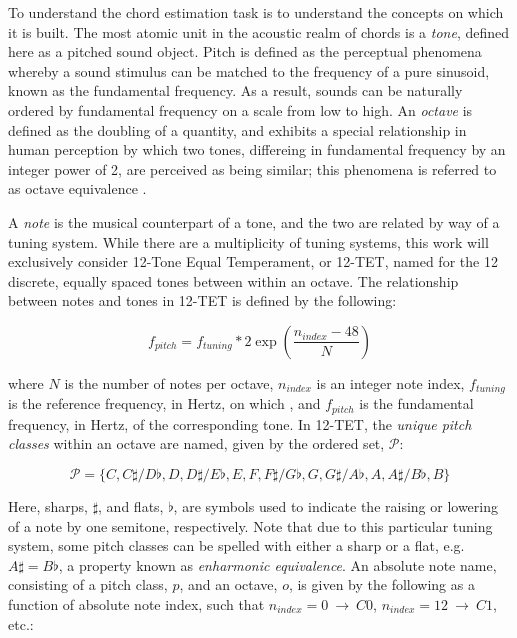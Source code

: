To understand the chord estimation task is to understand the concepts on which it is built.
The most atomic unit in the acoustic realm of chords is a \emph{tone}, defined here as a pitched sound object.
Pitch is defined as the perceptual phenomena whereby a sound stimulus can be matched to the frequency of a pure sinusoid, known as the fundamental frequency.
As a result, sounds can be naturally ordered by fundamental frequency on a scale from low to high.
An \emph{octave} is defined as the doubling of a quantity, and exhibits a special relationship in human perception by which two tones, differeing in fundamental frequency by an integer power of 2, are perceived as being similar; this phenomena is referred to as octave equivalence \cite{?}.

A \emph{note} is the musical counterpart of a tone, and the two are related by way of a tuning system.
While there are a multiplicity of tuning systems, this work will exclusively consider 12-Tone Equal Temperament, or 12-TET, named for the 12 discrete, equally spaced tones between within an octave.
The relationship between notes and tones in 12-TET is defined by the following:

\begin{equation}
\label{eq:tuning}
f_{pitch} = f_{tuning} * 2 \exp(\frac{n_{index} - 48}{N})
\end{equation}

\noindent where $N$ is the number of notes per octave, $n_{index}$ is an integer note index, $f_{tuning}$ is the reference frequency, in Hertz, on which , and $f_{pitch}$ is the fundamental frequency, in Hertz, of the corresponding tone.
In 12-TET, the \emph{unique pitch classes} within an octave are named, given by the ordered set, $\mathcal{P}$:

\begin{equation}
\label{eq:pitch_classes}
\mathcal{P} = \{C, C\sharp / D\flat, D, D\sharp / E\flat, E, F, F\sharp / G\flat, G, G\sharp / A\flat, A, A\sharp / B\flat, B\}
\end{equation}

Here, sharps, $\sharp$, and flats, $\flat$, are symbols used to indicate the raising or lowering of a note by one semitone, respectively.
Note that due to this particular tuning system, some pitch classes can be spelled with either a sharp or a flat, e.g. $A\sharp = B\flat$, a property known as \emph{enharmonic equivalence}.
An absolute note name, consisting of a pitch class, $p$, and an octave, $o$, is given by the following as a function of absolute note index, such that $n_{index}=0~\to~C0$, $n_{index}=12~\to~C1$, etc.:

